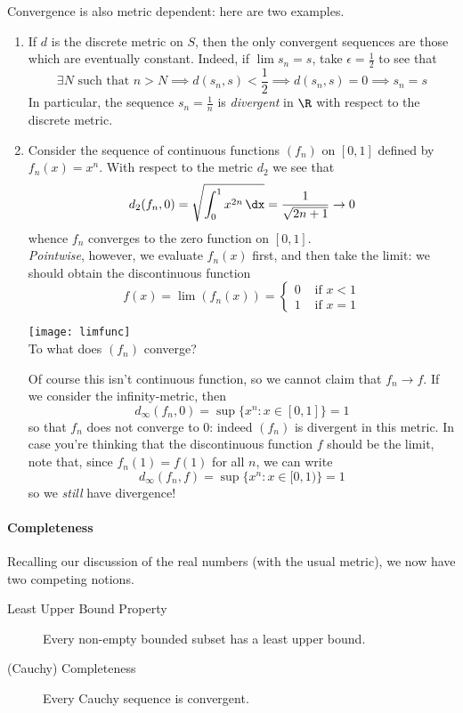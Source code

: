 Convergence is also metric dependent: here are two examples.

\begin{enumerate}
  \item If $d$ is the discrete metric on $S$, then the only convergent sequences are those which are eventually constant. Indeed, if $\lim s_n=s$, take $\epsilon=\frac 12$ to see that
  \[\exists N\text{ such that }n>N\implies d(s_n,s)<\frac 12\implies d(s_n,s)=0\implies s_n=s\]
  In particular, the sequence $s_n=\frac 1n$ is \emph{divergent} in $\R$ with respect to the discrete metric.
  \item Consider the sequence of continuous functions $(f_n)$ on $[0,1]$ defined by $f_n(x)=x^n$. With respect to the metric $d_2$ we see that
	\[d_2(f_n,0)=\sqrt{\int_0^1x^{2n}\,\dx}=\frac 1{\sqrt{2n+1}}\to 0\]
	whence $f_n$ converges to the zero function on $[0,1]$.\\
	\emph{Pointwise}, however, we evaluate $f_n(x)$ first, and then take the limit: we should obtain the discontinuous function
	\[f(x)=\lim(f_n(x))=\begin{cases}
	0&\text{ if $x<1$}\\
	1&\text{ if $x=1$}
	\end{cases}\]
	\begin{center}
	\texttt{[image: limfunc]}\\
	To what does $(f_n)$ converge?
	\end{center}
	Of course this isn't continuous function, so we cannot claim that $f_n\to f$. If  we consider the infinity-metric, then
	\[d_\infty(f_n,0)=\sup\{x^n:x\in[0,1]\}=1\]
	so that $f_n$ does not converge to $0$: indeed $(f_n)$ is divergent in this metric. In case you're thinking that the discontinuous function $f$ should be the limit, note that, since $f_n(1)=f(1)$ for all $n$, we can write
	\[d_\infty(f_n,f)=\sup\{x^n:x\in[0,1)\}=1\]
	so we \emph{still} have divergence!
\end{enumerate} 

\paragraph{Completeness}

Recalling our discussion of the real numbers (with the usual metric), we now have two competing notions.

\begin{description}
	\item[Least Upper Bound Property] Every non-empty bounded subset has a least upper bound.
	\item[(Cauchy) Completeness] Every Cauchy sequence is convergent. 
\end{description}

